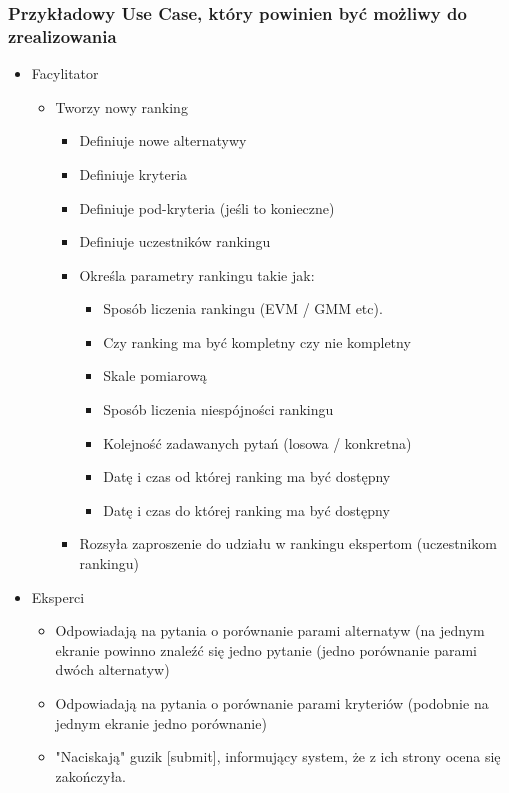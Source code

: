 \documentclass{article}
\begin{document}
\subsubsection{Przykładowy Use Case, który powinien być możliwy do zrealizowania}
\begin{itemize}
    \item Facylitator
    \begin{itemize}
        \item Tworzy nowy ranking
        \begin{itemize}
            \item Definiuje nowe alternatywy
            \item Definiuje kryteria
            \item Definiuje pod-kryteria (jeśli to konieczne)
            \item Definiuje uczestników rankingu
            \item Określa parametry rankingu takie jak:
            \begin{itemize}
                \item Sposób liczenia rankingu (EVM / GMM etc).
                \item Czy ranking ma być kompletny czy nie kompletny
                \item Skale pomiarową
                \item Sposób liczenia niespójności rankingu
                \item Kolejność zadawanych pytań (losowa / konkretna)
                \item Datę i czas od której ranking ma być dostępny
                \item Datę i czas do której ranking ma być dostępny
            \end{itemize}
            \item Rozsyła zaproszenie do udziału w rankingu ekspertom (uczestnikom rankingu)
        \end{itemize}
    \end{itemize}

    \item Eksperci
    \begin{itemize}
        \item Odpowiadają na pytania o porównanie parami alternatyw (na jednym ekranie powinno znaleźć się jedno pytanie (jedno porównanie parami dwóch alternatyw)
        \item Odpowiadają na pytania o porównanie parami kryteriów (podobnie na jednym ekranie jedno porównanie)
        \item "Naciskają" guzik [submit], informujący system, że z ich strony ocena się zakończyła.
    \end{itemize}


\end{itemize}
\end{document}
